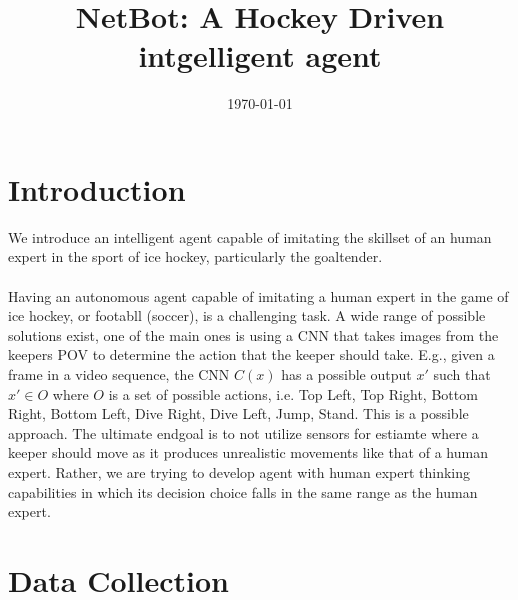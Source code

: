 \documentclass[a4paper]{article}
\title{NetBot: A Hockey Driven intgelligent agent}
\date{\today}
\begin{document}
\maketitle
\section{Introduction}
We introduce an intelligent agent capable of imitating the skillset of an human expert in the sport of ice hockey, particularly the goaltender. 
\\ \\

Having an autonomous agent capable of imitating a human expert in the game of ice hockey, or footabll (soccer), is a challenging task. A wide range of possible solutions exist, one of the main ones is using a CNN that takes images from the keepers POV to determine the action that the keeper should take. E.g., given a frame in a video sequence, the CNN $C(x)$ has a possible output $x'$ such that $x' \in O$ where $O$ is a set of possible actions, i.e. {Top Left, Top Right, Bottom Right, Bottom Left, Dive Right, Dive Left, Jump, Stand}. This is a possible approach. The ultimate endgoal is to not utilize sensors for estiamte where a keeper should move as it produces unrealistic movements like that of a human expert. Rather, we are trying to develop agent with human expert thinking capabilities in which its decision choice falls in the same range as the human expert.

\section{Data Collection}
\end{document}
